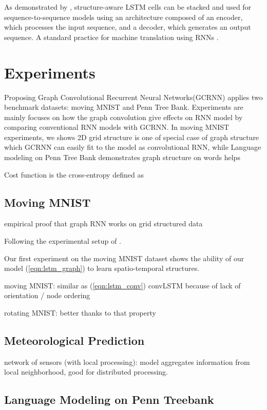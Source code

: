 \documentclass{article} %
\newcommand{\eqnref}[1]{(\ref{eqn:#1})}
\newcommand{\todo}[1]{{\color{red} #1 }}
\begin{document}
As demonstrated by \citet{convlstm}, structure-aware LSTM cells can be stacked
and used for sequence-to-sequence models using an architecture composed of an
encoder, which processes the input sequence, and a decoder, which generates an
output sequence. A standard practice for machine translation using RNNs
\citep{gru, seq2seq}.

\section{Experiments}

Proposing Graph Convolutional Recurrent Neural Networks(GCRNN) applies two benchmark datasets: moving MNIST\citet{moving_mnist} and Penn Tree Bank\citet{ptb}. Experiments are mainly focuses on how the graph convolution give effects on RNN model by comparing conventional RNN models with GCRNN. In moving MNIST experiments, we shows 2D grid structure is one of special case of graph structure which GCRNN can easily fit to the model as convolutional RNN, while Language modeling on Penn Tree Bank demonstrates graph structure on words helps 

Cost function is the cross-entropy defined as

\subsection{Moving MNIST}
\todo{empirical proof that graph RNN works on grid structured data}


Following the experimental setup of \citet{convlstm}.

Our first experiment on the moving MNIST dataset \citet{moving_mnist} shows the
ability of our model \eqnref{lstm_graph} to learn spatio-temporal structures.

moving MNIST: similar as \eqnref{lstm_conv} convLSTM because of lack of orientation / node ordering

rotating MNIST: better thanks to that property

\subsection{Meteorological Prediction}

network of sensors (with local processing):
model aggregates information from local neighborhood, good for distributed processing.

\subsection{Language Modeling on Penn Treebank}
\end{document}
